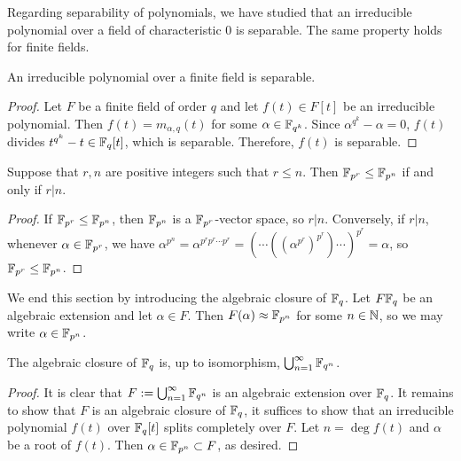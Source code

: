 Regarding separability of polynomials, we have studied that an irreducible polynomial over a field of characteristic 0 is separable.
The same property holds for finite fields.
\begin{prop}
    An irreducible polynomial over a finite field is separable.
\end{prop}
\begin{proof}
    Let $F$ be a finite field of order $q$ and let $f(t)\in F[t]$ be an irreducible polynomial.
    Then $f(t)=m_{\alpha, q}(t)$ for some $\alpha\in{\mathbb{F}}_{q^k}$.
    Since $\alpha^{q^k}-\alpha=0$, $f(t)$ divides $t^{q^k}-t\in{\mathbb{F}}_q[t]$, which is separable.
    Therefore, $f(t)$ is separable.
\end{proof}

\begin{prop}
    Suppose that $r, n$ are positive integers such that $r\leq n$.
    Then ${\mathbb{F}}_{p^r}\leq{\mathbb{F}}_{p^n}$ if and only if $r|n$.
\end{prop}
\begin{proof}
    If ${\mathbb{F}}_{p^r}\leq{\mathbb{F}}_{p^n}$, then ${\mathbb{F}}_{p^n}$ is a ${\mathbb{F}}_{p^r}$-vector space, so $r|n$.
    Conversely, if $r|n$, whenever $\alpha\in{\mathbb{F}}_{p^r}$, we have $\alpha^{p^n}=\alpha^{p^r p^r \cdots p^r}=(\cdots((\alpha^{p^r})^{p^r})\cdots)^{p^r}=\alpha$, so ${\mathbb{F}}_{p^r}\leq{\mathbb{F}}_{p^n}$.
\end{proof}

We end this section by introducing the algebraic closure of ${\mathbb{F}}_q$.
Let $F{\mathbb{F}}_q$ be an algebraic extension and let $\alpha\in F$.
Then $F(\alpha)\approx{\mathbb{F}}_{p^n}$ for some $n\in{\mathbb{N}}$, so we may write $\alpha\in{\mathbb{F}}_{p^n}$.
\begin{thm}
    The algebraic closure of ${\mathbb{F}}_q$ is, up to isomorphism, $\bigcup_{n=1}^\infty {\mathbb{F}}_{q^n}$.
\end{thm}
\begin{proof}
    It is clear that $F:=\bigcup_{n=1}^\infty {\mathbb{F}}_{q^n}$ is an algebraic extension over ${\mathbb{F}}_q$.
    It remains to show that $F$ is an algebraic closure of ${\mathbb{F}}_q$, it suffices to show that an irreducible polynomial $f(t)$ over ${\mathbb{F}}_q[t]$ splits completely over $F$.
    Let $n=\deg f(t)$ and $\alpha$ be a root of $f(t)$.
    Then $\alpha\in{\mathbb{F}}_{p^n}\subset F$, as desired.
\end{proof}